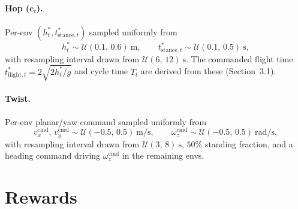 \documentclass[11pt, a4paper]{article}
\begin{document}
\paragraph{Hop ($\bm{c}_t$).} Per-env $(h^{*}_t, t^{*}_{\mathrm{stance},t})$
sampled uniformly from
\begin{equation}
    h^{*}_t \sim \mathcal{U}(0.1,\,0.6)\ \mathrm{m},
    \qquad
    t^{*}_{\mathrm{stance},t} \sim \mathcal{U}(0.1,\,0.5)\ \mathrm{s},
\end{equation}
with resampling interval drawn from $\mathcal{U}(6,\,12)\ \mathrm{s}$. The
commanded flight time $t^{*}_{\mathrm{flight},t} = 2\sqrt{2 h^{*}_t / g}$ and
cycle time $T_t$ are derived from these (Section~3.1).

\paragraph{Twist.} Per-env planar/yaw command sampled uniformly from
\begin{equation}
    v^{\mathrm{cmd}}_x,\,v^{\mathrm{cmd}}_y \sim \mathcal{U}(-0.5,\,0.5)\
    \mathrm{m/s},
    \qquad
    \omega^{\mathrm{cmd}}_z \sim \mathcal{U}(-0.5,\,0.5)\ \mathrm{rad/s},
\end{equation}
with resampling interval drawn from $\mathcal{U}(3,\,8)\ \mathrm{s}$, $50\%$
standing fraction, and a heading command driving $\omega^{\mathrm{cmd}}_z$ in
the remaining envs.

\section{Rewards}
\end{document}

